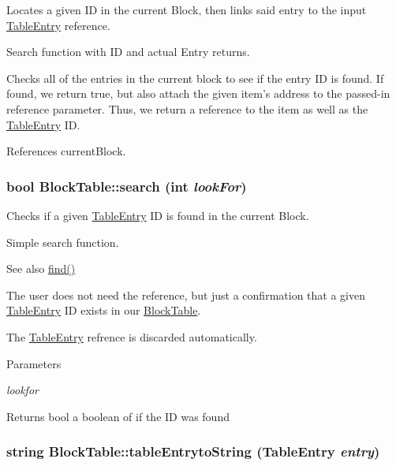 Locates a given ID in the current Block, then links said entry to the input \hyperlink{structTableEntry}{TableEntry} reference. 

Search function with ID and actual Entry returns.

Checks all of the entries in the current block to see if the entry ID is found. If found, we return true, but also attach the given item's address to the passed-\/in reference parameter. Thus, we return a reference to the item as well as the \hyperlink{structTableEntry}{TableEntry} ID. 

References currentBlock.

\hypertarget{classBlockTable_aa34f1de4dcf9db81aa420d2a9aca3a7c}{
\subsubsection[{search}]{\setlength{\rightskip}{0pt plus 5cm}bool BlockTable::search (int {\em lookFor})}}
\label{classBlockTable_aa34f1de4dcf9db81aa420d2a9aca3a7c}


Checks if a given \hyperlink{structTableEntry}{TableEntry} ID is found in the current Block. 

Simple search function.

\begin{DoxySeeAlso}{See also}
\hyperlink{classBlockTable_a53d24a1a4460701c8129eabcebfa0870}{find()}
\end{DoxySeeAlso}
The user does not need the reference, but just a confirmation that a given \hyperlink{structTableEntry}{TableEntry} ID exists in our \hyperlink{classBlockTable}{BlockTable}.

The \hyperlink{structTableEntry}{TableEntry} refrence is discarded automatically. 
\begin{DoxyParams}{Parameters}
\item[{\em lookfor}]\end{DoxyParams}
\begin{DoxyReturn}{Returns}
bool a boolean of if the ID was found 
\end{DoxyReturn}
\hypertarget{classBlockTable_aeabaace35d80418e397dcf20c230f9b9}{
\subsubsection[{tableEntrytoString}]{\setlength{\rightskip}{0pt plus 5cm}string BlockTable::tableEntrytoString ({\bf TableEntry} {\em entry})}}
\label{classBlockTable_aeabaace35d80418e397dcf20c230f9b9}


